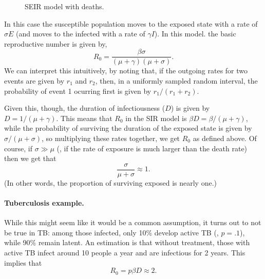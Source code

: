\documentclass[12pt]{article}
\begin{document}
\begin{figure}[ht!]
\centering
{}
\caption{SEIR model with deaths.}
\label{fig:seir-deaths}
\end{figure}


In this case the susceptible population moves to the exposed state with a rate of $\sigma E$ (and moves to the infected with a rate of $\gamma I$). In this model. the basic reproductive number is given by,
\[
R_0 = \frac{\beta \sigma}{(\mu + \gamma)(\mu + \sigma)}.
\]
We can interpret this intuitively, by noting that, if the outgoing rates for two events are given by $r_1$ and $r_2$, then, in a uniformly sampled random interval, the probability of event 1 ocurring first is given by $r_1/(r_1 + r_2)$.

Given this, though, the duration of infectiousness ($D$) is given by $D = 1 / (\mu + \gamma)$. This means that $R_0$ in the SIR model is $\beta D = \beta / (\mu + \gamma)$, while the probability of surviving the duration of the exposed state is given by $\sigma / (\mu + \sigma)$, so multiplying these rates together, we get $R_0$ as defined above. Of course, if $\sigma \gg \mu$ (\ie, if the rate of exposure is much larger than the death rate) then we get that
\[
\frac{\sigma}{\mu + \sigma} \approx 1.
\]
(In other words, the proportion of surviving exposed is nearly one.)
\paragraph{Tuberculosis example.} While this might seem like it would be a common assumption, it turns out to not be true in TB: among those infected, only 10\% develop active TB (\ie, $p = .1$), while 90\% remain latent. An estimation is that without treatment, those with active TB infect around 10 people a year and are infectious for 2 years. This implies that
\[
R_0 = p\beta D \approx 2.
\]
\end{document}
